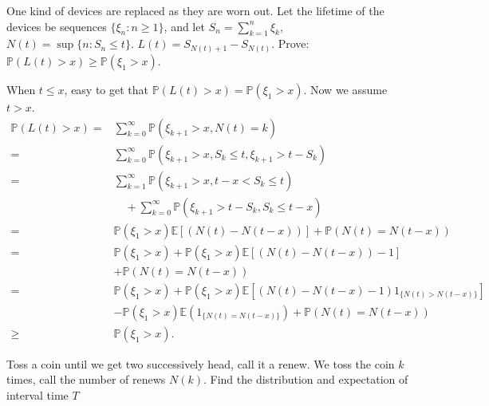 \documentclass{ctexart}
\begin{document}
\begin{problem}\label{pro:4}
  One kind of devices are replaced as they are worn out.
  Let the lifetime of the devices be sequences
  \(\{\xi_n:n \geq 1\}\), and let \(S_n=\sum_{k=1}^{n} \xi_k\), \(N(t)=\sup \{n: S_n \leq t\}\). \(L(t)=S_{N(t) + 1}-S_{N(t)}\).
  Prove: \(\mathbb{P}(L(t)> x) \geq \mathbb{P}(\xi_1 > x)\).
\end{problem}
\begin{solution}
  When \(t \leq x\), easy to get that \(\mathbb{P}(L(t)>x)=\mathbb{P}(\xi_1>x)\).
  Now we assume \(t > x\).
  \begin{equation}
    \begin{aligned}
      \mathbb{P}(L(t)>x)= & \sum_{k=0}^{\infty} \mathbb{P}\left(\xi_{k+1}>x, N(t)=k\right)                                                           \\
      = & \sum_{k=0}^{\infty} \mathbb{P}\left(\xi_{k+1}>x, S_k \leq t, \xi_{k+1}>t-S_k\right)                                      \\
      = & \sum_{k=1}^{\infty} \mathbb{P}\left(\xi_{k+1}>x, t-x<S_k \leq t\right)                                                   \\
      & \quad+\sum_{k=0}^{\infty} \mathbb{P}\left(\xi_{k+1}>t-S_k, S_k \leq t-x\right)                                           \\
      =                   & \mathbb{P}\left(\xi_1>x\right) \mathbb{E}[(N(t)-N(t-x))]+\mathbb{P}(N(t)=N(t-x))                                         \\
      =                   & \mathbb{P}\left(\xi_1>x\right)+\mathbb{P}\left(\xi_1>x\right) \mathbb{E}[(N(t)-N(t-x))-1]                                \\
      & +\mathbb{P}(N(t)=N(t-x))                                                                                                 \\
      =                   & \mathbb{P}\left(\xi_1>x\right)+\mathbb{P}\left(\xi_1>x\right) \mathbb{E}\left[(N(t)-N(t-x)-1) 1_{\{N(t)>N(t-x)\}}\right] \\
      & -\mathbb{P}\left(\xi_1>x\right) \mathbb{E}\left(1_{\{N(t)=N(t-x)\}}\right)+\mathbb{P}(N(t)=N(t-x))                       \\
      \geq                & \mathbb{P}\left(\xi_1>x\right) .
    \end{aligned}
  \end{equation}
\end{solution}
\begin{problem}\label{pro:-1}
  Toss a coin until we get two successively head, call it a renew.
  We toss the coin \(k\) times, call the number of renews \(N(k)\).
  Find the distribution and expectation of interval time \(T\)
\end{problem}
\end{document}
